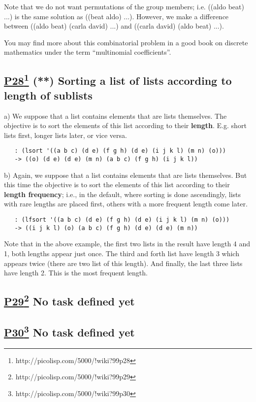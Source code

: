\documentclass[10pt,a4paper]{article}
\begin{document}
Note that we do not want permutations of the group members; i.e.
((aldo beat) ...) is the same solution as ((beat aldo) ...). However,
we make a difference between ((aldo beat) (carla david) ...) and
((carla david) (aldo beat) ...).

You may find more about this combinatorial problem in a good book
on discrete mathematics under the term ``multinomial coefficients''.

\subsection*{\underline{P28}\footnote{http://picolisp.com/5000/!wiki?99p28} (**) Sorting a list of lists according to length of sublists}
a) We suppose that a list contains elements that are
lists themselves. The objective is to sort the elements of this list
according to their \textbf{length}. E.g. short lists first, longer lists
later, or vice versa.
\begin{verbatim}
   : (lsort '((a b c) (d e) (f g h) (d e) (i j k l) (m n) (o)))
   -> ((o) (d e) (d e) (m n) (a b c) (f g h) (i j k l))
\end{verbatim}

b) Again, we suppose that a list contains elements that are
lists themselves. But this time the objective is to sort the elements
of this list according to their \textbf{length frequency}; i.e.,
in the default,
where sorting is done ascendingly, lists with rare lengths are placed
first, others with a more frequent length come later.
\begin{verbatim}
   : (lfsort '((a b c) (d e) (f g h) (d e) (i j k l) (m n) (o)))
   -> ((i j k l) (o) (a b c) (f g h) (d e) (d e) (m n))
\end{verbatim}

Note that in the above example, the first two lists in the result
have length 4 and 1, both lengths appear just once. The third and
forth list have length 3 which appears twice (there are two list of this
length). And finally, the last three lists have length 2. This is
the most frequent length.

\subsection*{\underline{P29}\footnote{http://picolisp.com/5000/!wiki?99p29} No task defined yet}
\subsection*{\underline{P30}\footnote{http://picolisp.com/5000/!wiki?99p30} No task defined yet}
\end{document}

